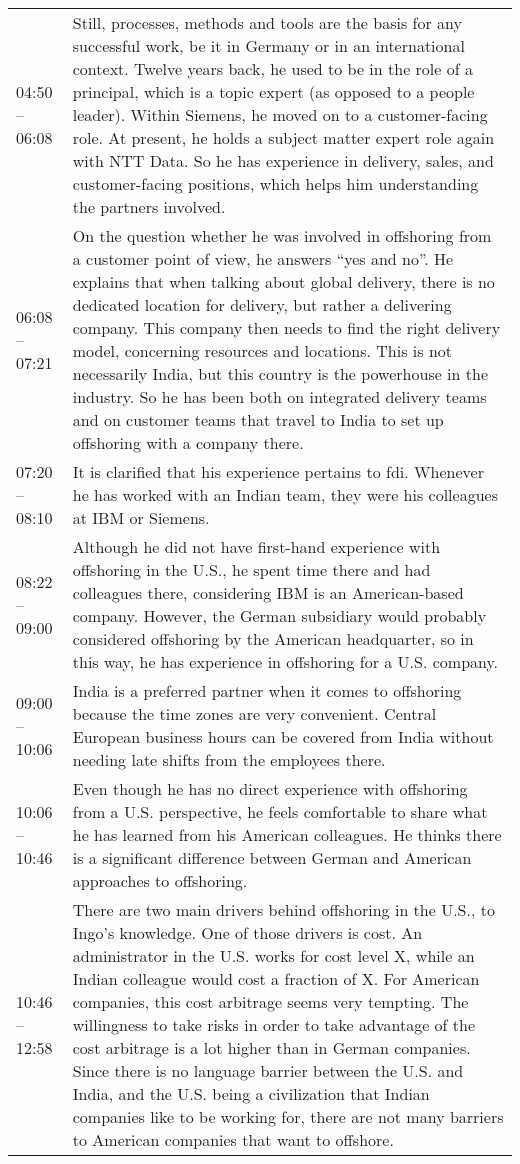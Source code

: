 \begin{appendix}
\begin{longtable}{l p{12.5cm}}
	04:50 -- 06:08&Still, processes, methods and tools are the basis for any successful work, be it in Germany or in an international context. Twelve years back, he used to be in the role of a principal, which is a topic expert (as opposed to a people leader). Within Siemens, he moved on to a customer-facing role. At present, he holds a subject matter expert role again with NTT Data. So he has experience in delivery, sales, and customer-facing positions, which helps him understanding the partners involved.\\
	06:08 -- 07:21&On the question whether he was involved in offshoring from a customer point of view, he answers ``yes and no''. He explains that when talking about global delivery, there is no dedicated location for delivery, but rather a delivering company. This company then needs to find the right delivery model, concerning resources and locations. This is not necessarily India, but this country is the powerhouse in the industry. So he has been both on integrated delivery teams and on customer teams that travel to India to set up offshoring with a company there.\\
	07:20 -- 08:10 & It is clarified that his experience pertains to \gls{fdi}. Whenever he has worked with an Indian team, they were his colleagues at IBM or Siemens.\\
	08:22 -- 09:00&Although he did not have first-hand experience with offshoring in the U.S., he spent time there and had colleagues there, considering IBM is an American-based company. However, the German subsidiary would probably considered offshoring by the American headquarter, so in this way, he has experience in offshoring for a U.S. company.\\
	09:00 -- 10:06& India is a preferred partner when it comes to offshoring because the time zones are very convenient. Central European business hours can be covered from India without needing late shifts from the employees there.\\
	10:06 -- 10:46&Even though he has no direct experience with offshoring from a U.S. perspective, he feels comfortable to share what he has learned from his American colleagues. He thinks there is a significant difference between German and American approaches to offshoring.\\
	10:46 -- 12:58& There are two main drivers behind offshoring in the U.S., to Ingo's knowledge. One of those drivers is cost. An administrator in the U.S. works for cost level X, while an Indian colleague would cost a fraction of X. For American companies, this cost arbitrage seems very tempting. The willingness to take risks in order to take advantage of the cost arbitrage is a lot higher than in German companies. Since there is no language barrier between the U.S. and India, and the U.S. being a civilization that Indian companies like to be working for, there are not many barriers to American companies that want to offshore.\\

\end{longtable}
\end{appendix}
